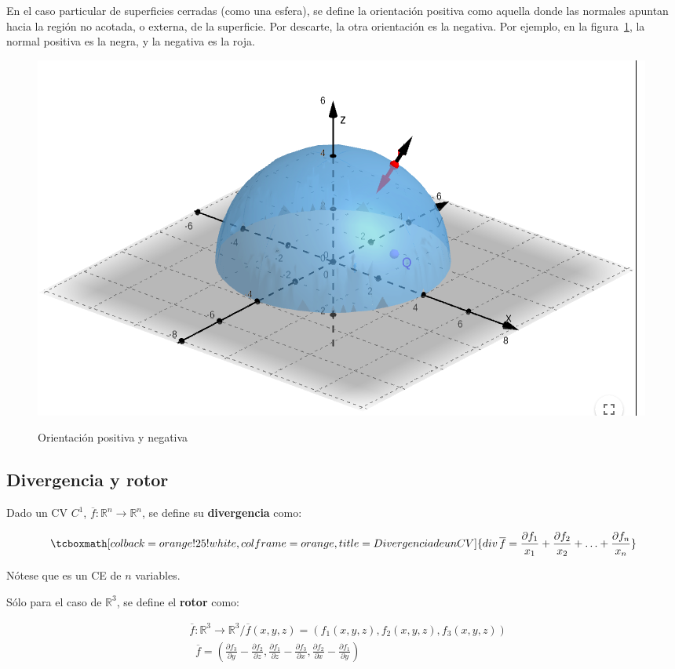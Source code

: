 \documentclass{article}
\renewcommand{\Bbb}{\mathbb}
\begin{document}
En el caso particular de superficies cerradas (como una esfera), se define la orientación positiva como aquella donde las normales apuntan hacia la región no acotada, o externa, de la superficie. Por descarte, la otra orientación es la negativa. Por ejemplo, en la figura~\ref{fig:son}, la normal positiva es la negra, y la negativa es la roja.

\begin{figure}[ht]
\centering
\caption{Orientación positiva y negativa}
\includegraphics[scale=0.6]{img/teo_fig029_son.png}
\label{fig:son}
\end{figure}

\subsection{Divergencia y rotor}

Dado un CV $C^1$, $\overline{f}: \Bbb R^n \rightarrow \Bbb R^n$, se define su \textbf{divergencia} como:

\begin{equation}
\tcboxmath[colback=orange!25!white,colframe=orange, title=Divergencia de un CV]
{ \mathop{div} \overline{f} = \frac{\partial f_1}{x_1} + \frac{\partial f_2}{x_2} + \ldots + \frac{\partial f_n}{x_n} }
\end{equation}

Nótese que es un CE de $n$ variables.

Sólo para el caso de $\Bbb R^3$, se define el \textbf{rotor} como:

\begin{align}
&\overline{f}:\Bbb R^3 \rightarrow \Bbb R^3 / \overline{f}(x,y,z) = (f_1(x,y,z), f_2(x,y,z), f_3(x,y,z)) \\
&\mathop{\overline{rot}} \overline{f} = \left( \frac{\partial f_3}{\partial y} - \frac{\partial f_2}{\partial z}, \frac{\partial f_1}{\partial z} - \frac{\partial f_3}{\partial x}, \frac{\partial f_2}{\partial x} - \frac{\partial f_1}{\partial y}  \right)
\end{align}
\end{document}
